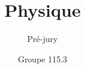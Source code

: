 \documentclass[pdf]{beamer}
\title{Physique}
\subtitle{Pré-jury}
\author{Groupe 115.3}
\begin{document}
\begin{frame}
	\titlepage
\end{frame}
\end{document}
